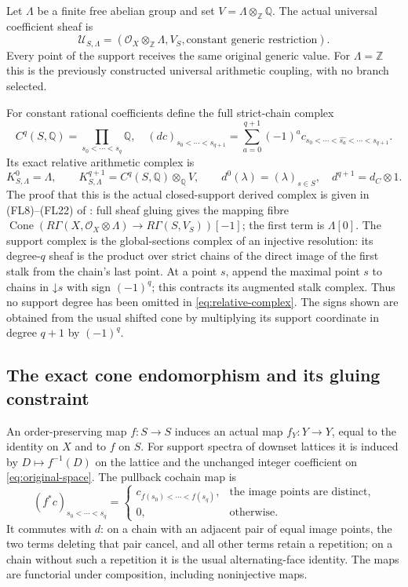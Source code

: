 \documentclass[11pt,a4paper]{article}
\theoremstyle{definition}\newtheorem{definition}[theorem]{Definition}
\newcommand{\Z}{\mathbb Z}\newcommand{\Q}{\mathbb Q}
\providecommand{\Cone}{\operatorname{Cone}}
\begin{document}
Let $\Lambda$ be a finite free abelian group and set
$V=\Lambda\otimes_{\Z}\Q$. The actual universal coefficient sheaf is
\[
 \mathcal U_{S,\Lambda}
   =(\mathcal O_X\otimes_{\Z}\Lambda,V_S,
                 \text{constant generic restriction}).
 \tag{SE3}\label{eq:universal-coefficients}
\]
Every point of the support receives the same original generic value.
For $\Lambda=\Z$ this is the previously constructed universal
arithmetic coupling, with no branch selected.

For constant rational coefficients define the full strict-chain complex
\[
 C^q(S,\Q)=\prod_{s_0<\cdots<s_q}\Q,
 \quad
 (dc)_{s_0<\cdots<s_{q+1}}
   =\sum_{a=0}^{q+1}(-1)^a
         c_{s_0<\cdots<\widehat{s_a}<\cdots<s_{q+1}}.
 \tag{SE4}\label{eq:support-complex}
\]
Its exact relative arithmetic complex is
\[
 K_{S,\Lambda}^0=\Lambda,\qquad
 K_{S,\Lambda}^{q+1}=C^q(S,\Q)\otimes_\Q V,\qquad
 d^0(\lambda)=(\lambda)_{s\in S},\quad d^{q+1}=d_C\otimes1.
 \tag{SE5}\label{eq:relative-complex}
\]
The proof that this is the actual closed-support derived complex is
given in (FL8)--(FL22) of :
full sheaf gluing gives the mapping fibre
$\Cone(R\Gamma(X,\mathcal O_X\otimes\Lambda)
\to R\Gamma(S,V_S))[-1]$; the first term is $\Lambda[0]$.
The support complex is the global-sections complex of an injective
resolution: its degree-$q$ sheaf
is the product over strict chains of the direct image of the first
stalk from the chain's last point. At a point $s$, append the maximal
point $s$ to chains in $\mathord\downarrow s$ with sign $(-1)^q$;
this contracts its augmented stalk complex. Thus no support degree
has been omitted in \eqref{eq:relative-complex}. The signs shown
are obtained from the usual shifted cone by multiplying its support
coordinate in degree $q+1$ by $(-1)^q$.

\subsection{The exact cone endomorphism and its gluing constraint}

An order-preserving map $f:S\to S$ induces an actual map
$f_Y:Y\to Y$, equal to the identity on $X$ and to $f$ on $S$.
For support spectra of downset lattices it is induced by
$D\mapsto f^{-1}(D)$ on the lattice and the unchanged integer
coefficient on \eqref{eq:original-space}.
The pullback cochain map is
\[
 (f^*c)_{s_0<\cdots<s_q}=
 \begin{cases}
 c_{f(s_0)<\cdots<f(s_q)},&\text{the image points are distinct},\\
 0,&\text{otherwise}.
 \end{cases}
 \tag{SE6}\label{eq:finite-pullback}
\]
It commutes with $d$: on a chain with an adjacent pair of equal image
points, the two terms deleting that pair cancel, and all other terms
retain a repetition; on a chain without such a repetition it is the
usual alternating-face identity. The maps are functorial under
composition, including noninjective maps.
\end{document}
